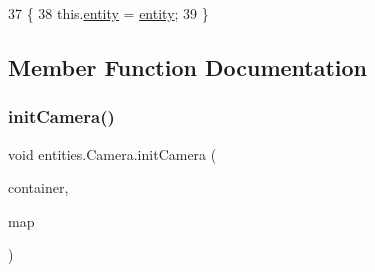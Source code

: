 \begin{DoxyCode}
37                                        \{
38         this.\mbox{\hyperlink{classentities_1_1_camera_ae57035ea7f7d7d60fc7da6cd51b93316}{entity}} = \mbox{\hyperlink{classentities_1_1_camera_ae57035ea7f7d7d60fc7da6cd51b93316}{entity}};
39     \}
\end{DoxyCode}


\subsection{Member Function Documentation}
\mbox{\label{classentities_1_1_camera_aae34158cc2c20916570929c01605dc5c}} 
\subsubsection{\texorpdfstring{init\+Camera()}{initCamera()}}
{\footnotesize\ttfamily void entities.\+Camera.\+init\+Camera (\begin{DoxyParamCaption}\item[{\mbox{\hyperlink{classorg_1_1newdawn_1_1slick_1_1_game_container}{Game\+Container}}}]{container,  }\item[{\mbox{\hyperlink{classentities_1_1_map}{Map}}}]{map }\end{DoxyParamCaption})\hspace{0.3cm}{\ttfamily [inline]}}


